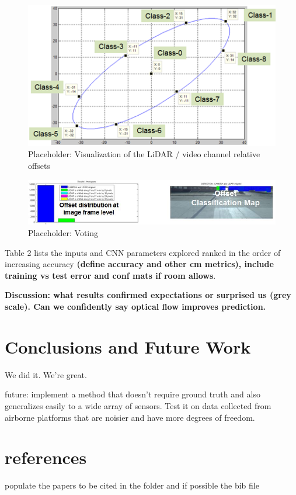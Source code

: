 \documentclass{article}
\begin{document}
\begin{figure}[htbp]
    \centering
        \includegraphics[scale=0.85]{Figures/ellipse.png}
    \caption{Placeholder: Visualization of the LiDAR / video channel relative offsets}
    \label{fig:Figures_Ellipse}
\end{figure}

\begin{figure}[htbp]
    \centering
        \includegraphics[scale=0.85]{Figures/Voting 5 class.jpg}
    \caption{Placeholder: Voting}
    \label{fig:Figures_Voting}
\end{figure}

Table 2 lists the inputs and CNN parameters explored ranked in the order of increasing accuracy \textbf{(define accuracy and other cm metrics), include training vs test error and conf mats if room allows}.  

 \textbf{Discussion: what results confirmed expectations or surprised us (grey scale). Can we confidently say optical flow improves prediction. }



\section{Conclusions and Future Work} %
\label{sec:conclusions_and_future_work}
We did it. We're great.

future: implement a method that doesn't require ground truth and also generalizes easily to a wide array of sensors. Test it on data collected from airborne platforms that are noisier and have more degrees of freedom. 



\section{references}
populate the papers to be cited in the folder and if possible the bib file




\end{document}
